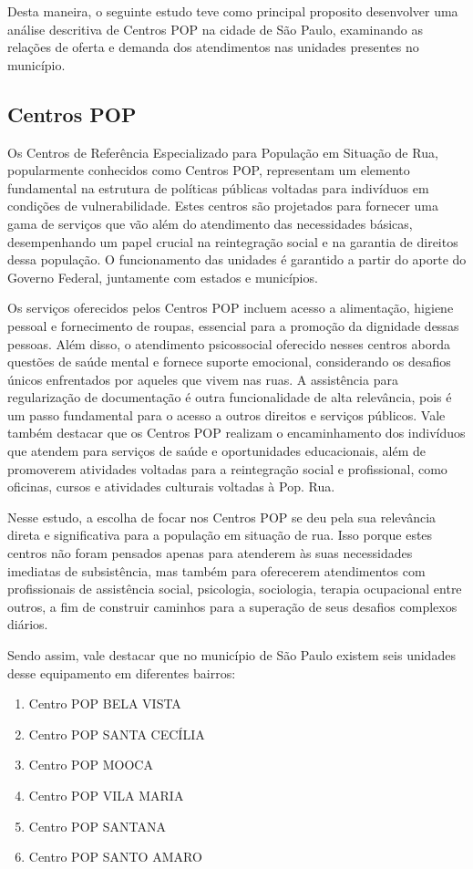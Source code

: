 Desta maneira, o seguinte estudo teve como principal proposito desenvolver uma análise descritiva de Centros POP na cidade de São Paulo, examinando as relações de oferta e demanda dos atendimentos nas unidades presentes no município. 


\subsection{Centros POP}
Os Centros de Referência Especializado para População em Situação de Rua, popularmente conhecidos como Centros POP, representam um elemento fundamental na estrutura de políticas públicas voltadas para indivíduos em condições de vulnerabilidade. Estes centros são projetados para fornecer uma gama de serviços que vão além do atendimento das necessidades básicas, desempenhando um papel crucial na reintegração social e na garantia de direitos dessa população. O funcionamento das unidades é garantido a partir do aporte do Governo Federal, juntamente com estados e municípios.

Os serviços oferecidos pelos Centros POP incluem acesso a alimentação, higiene pessoal e fornecimento de roupas, essencial para a promoção da dignidade dessas pessoas. Além disso, o atendimento psicossocial oferecido nesses centros aborda questões de saúde mental e fornece suporte emocional, considerando os desafios únicos enfrentados por aqueles que vivem nas ruas. A assistência para regularização de documentação é outra funcionalidade de alta relevância, pois é um passo fundamental para o acesso a outros direitos e serviços públicos. Vale também destacar que os Centros POP realizam o encaminhamento dos indivíduos que atendem para serviços de saúde e oportunidades educacionais, além de promoverem atividades voltadas para a reintegração social e profissional, como oficinas, cursos e atividades culturais voltadas à Pop. Rua.

Nesse estudo, a escolha de focar nos Centros POP se deu pela sua relevância direta e significativa para a população em situação de rua. Isso porque estes centros não foram pensados apenas para atenderem às suas necessidades imediatas de subsistência, mas também para oferecerem atendimentos com profissionais de assistência social, psicologia, sociologia, terapia ocupacional entre outros, a fim de construir caminhos para a superação de seus desafios complexos diários.

Sendo assim, vale destacar que no município de São Paulo existem seis unidades desse equipamento em diferentes bairros:
\begin{enumerate}
    \item Centro POP BELA VISTA
    \item Centro POP SANTA CECÍLIA
    \item Centro POP MOOCA
    \item Centro POP VILA MARIA
    \item Centro POP SANTANA
    \item Centro POP SANTO AMARO
\end{enumerate}

